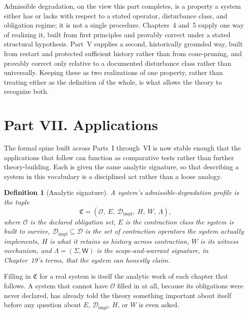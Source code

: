 \documentclass[11pt]{report}
\newtheorem{definition}{Definition}[chapter]
\begin{document}
\bigskip

Admissible degradation, on the view this part completes, is a property a system either has or lacks with respect to a stated operator, disturbance class, and obligation regime; it is not a single procedure. Chapters~4 and~5 supply one way of realizing it, built from first principles and provably correct under a stated structural hypothesis. Part~V supplies a second, historically grounded way, built from restart and protected sufficient history rather than from cone-pruning, and provably correct only relative to a documented disturbance class rather than universally. Keeping these as two realizations of one property, rather than treating either as the definition of the whole, is what allows the theory to recognize both.

\part*{Part VII. Applications}

The formal spine built across Parts~I through~VI is now stable enough that the applications that follow can function as comparative tests rather than further theory-building. Each is given the same analytic signature, so that describing a system in this vocabulary is a disciplined act rather than a loose analogy.

\begin{definition}[Analytic signature]
A system's admissible-degradation profile is the tuple
\[
\mathfrak C = (\mathcal O,\ E,\ \mathcal D_{\mathrm{impl}},\ H,\ W,\ \Lambda),
\]
where $\mathcal O$ is the declared obligation set, $E$ is the contraction class the system is built to survive, $\mathcal D_{\mathrm{impl}} \subseteq \mathcal D$ is the set of contraction operators the system actually implements, $H$ is what it retains as history across contraction, $W$ is its witness mechanism, and $\Lambda = (\Sigma, \mathsf W)$ is the scope-and-warrant signature, in Chapter~19's terms, that the system can honestly claim.
\end{definition}

Filling in $\mathfrak C$ for a real system is itself the analytic work of each chapter that follows. A system that cannot have $\mathcal O$ filled in at all, because its obligations were never declared, has already told the theory something important about itself before any question about $E$, $\mathcal D_{\mathrm{impl}}$, $H$, or $W$ is even asked.
\end{document}
